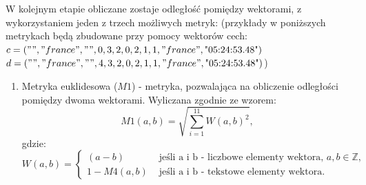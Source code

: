 \documentclass{classrep}
\begin{document}

W kolejnym etapie obliczane zostaje odległość pomiędzy wektorami, z wykorzystaniem
jeden z trzech możliwych metryk: 
(przykłady w poniższych metrykach będą zbudowane przy pomocy wektorów cech: \\
 $c = ("", "france", "", 0, 3, 2, 0, 2, 1, 1, "france", \text{"05:24:53.48"})$ \\
 $d = ("", "france", "", 4, 3, 2, 0, 2, 1, 1, "france", \text{"05:24:53.48"})$)

\begin{enumerate}
  \item Metryka euklidesowa ($M1$) -  metryka, pozwalająca na obliczenie odległości pomiędzy dwoma wektorami. Wyliczana zgodnie ze wzorem:
  \begin{equation}
    M1(a,b) = \sqrt{\sum_{i=1}^{11} W(a, b)^2},
  \end{equation} 
  gdzie:
  \begin{equation}
    W(a, b) = 
    \begin{cases}
      (a - b)   & \text{ jeśli a i b - liczbowe elementy wektora, } a,b \in \mathbb{Z},\\
      1- M4(a, b) & \text{ jeśli a i b - tekstowe elementy wektora.} 
    \end{cases}
  \end{equation}


\end{enumerate}
\end{document}
